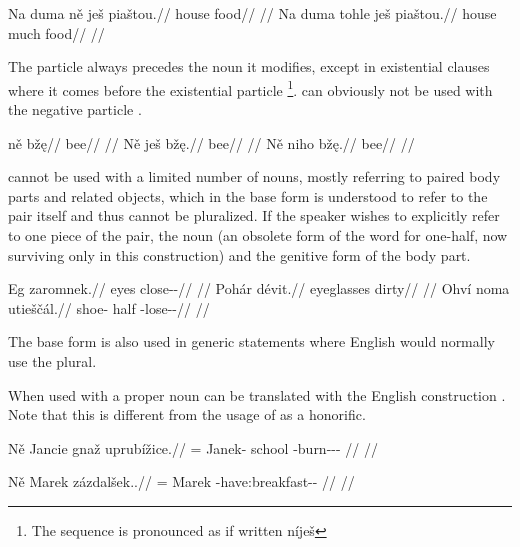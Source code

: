\pex
\a
\begingl
\gla *Na duma ně ješ piaštou.//
\glb \Loc{} house \Pl{} \Exst{} food//
\glft {}//
\endgl
\a
\begingl
\gla Na duma tohle ješ piaštou.//
\glb \Loc{} house much \Exst{} food//
\glft {}//
\endgl
\xe

The particle  always precedes the noun it modifies, except in existential clauses where it comes before the existential particle \footnote{The sequence is pronounced as if written níješ }.  can obviously not be used with the negative particle .

\pex
\a
\begingl
\gla ně bž\k{e}//
\glb \Pl{} bee//
\glft {}//
\endgl
\a
\begingl
\gla Ně ješ bž\k{e}.//
\glb \Pl{} \Exst{} bee//
\glft {}//
\endgl
\a
\begingl
\gla *Ně niho bž\k{e}.//
\glb \Pl{}  bee//
\glft {}//
\endgl
\xe

 cannot be used with a limited number of nouns, mostly referring to paired body parts and related objects, which in the base form is understood to refer to the pair itself and thus cannot be pluralized. If the speaker wishes to explicitly refer to one piece of the pair, the noun  (an obsolete form of the word for one-half, now surviving only in this construction) and the genitive form of the body part.

\pex
\begingl
\gla Eg zaromnek.//
\glb eyes close-\Pv{}-\Pf{}//
\glft {}//
\endgl
\xe
\pex
\begingl
\gla Pohár dévit.//
\glb eyeglasses dirty//
\glft {}//
\endgl
\xe
\pex
\begingl
\gla Ohví noma utieščál.//
\glb shoe-\Gen{} half \Refl{}-lose-\Av{}-\Cont{}//
\glft {}//
\endgl
\xe

The base form is also used in generic statements where English would normally use the plural.


When used with a proper noun  can be translated with the English construction . Note that this is different from the usage of  as a honorific.

\pex
\begingl
    \gla Ně Jancie gnaž uprubížice.//
    \glb \Pl{}= Janek-\Gen{} school \Refl{}-burn-\Av{}-\Pf{}-\Quot{} //
    \glft {}//
\endgl
\xe

\pex
\begingl
    \gla Ně Marek zázdalšek..//
    \glb \Pl{}= Marek \Neg{}-have:breakfast-\Av{}-\Pf{} //
    \glft {}//
\endgl
\xe


